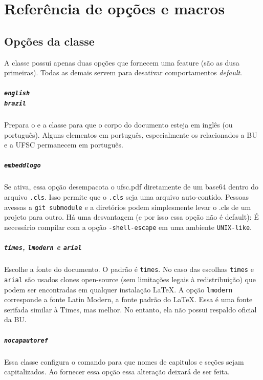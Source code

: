 \documentclass[embeddedlogo]{ufsc-thesis-rn46-2019}
\begin{document}
\chapter{Referência de opções e macros}
\label{ch:ref}

\section{Opções da classe}

A classe possui apenas duas opções que fornecem uma feature (são as dusa primeiras). Todas as demais servem para desativar comportamentos \textit{default}.

\paragraph*{\texttt{english} \\
            \texttt{brazil}}
Prepara o \abnTeX e a classe para que o corpo do documento esteja em inglês (ou português). Alguns elementos em português, especialmente os relacionados a BU e a UFSC permanecem em português.

\paragraph*{\texttt{embeddlogo}} Se ativa, essa opção desempacota o ufsc.pdf diretamente de um base64 dentro do arquivo \texttt{.cls}. Isso permite que o \texttt{.cls} seja uma arquivo auto-contido. Pessoas avessas a \texttt{git submodule} e a diretórios podem simplesmente levar o .cls de um projeto para outro. Há uma desvantagem (e por isso essa opção não é default): É necessário compilar com a opção \texttt{-shell-escape} em uma ambiente \texttt{UNIX-like}.

\paragraph*{\texttt{times}, \texttt{lmodern} e \texttt{arial}} Escolhe a fonte do documento. O padrão é \texttt{times}. No caso das escolhas \texttt{times} e \texttt{arial} são usados clones open-source (sem limitações legais à redistribuição) que podem ser encontradas em qualquer instalação \LaTeX. A opção \texttt{lmodern} corresponde a fonte Latin Modern, a fonte padrão do \LaTeX. Essa é uma fonte serifada similar à Times, mas melhor. No entanto, ela não possui respaldo oficial da BU.

\paragraph*{\texttt{nocapautoref}} Essa classe configura o comando \mt{\autoref} para que nomes de capitulos e seções sejam capitalizados. Ao fornecer essa opção essa alteração deixará de ser feita.
\end{document}
